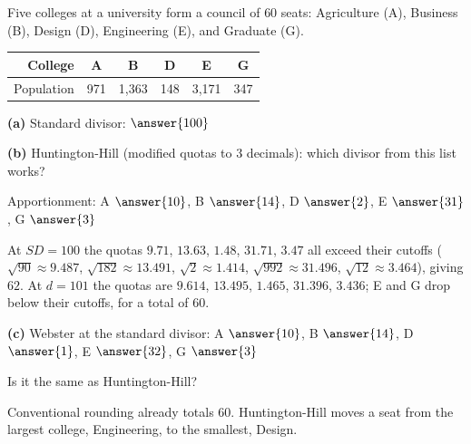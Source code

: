 \documentclass[12pt]{ximera}
\begin{document}
\begin{problem}
Five colleges at a university form a council of $60$ seats: Agriculture (A), Business
(B), Design (D), Engineering (E), and Graduate (G).
\begin{center}
\begin{tabular}{r|ccccc}
College & A & B & D & E & G\\\hline
Population & 971 & 1,363 & 148 & 3,171 & 347
\end{tabular}
\end{center}

\begin{prompt}
\textbf{(a)} Standard divisor: $\answer{100}$
\end{prompt}

\begin{prompt}
\textbf{(b)} Huntington-Hill (modified quotas to $3$ decimals): which divisor from this
list works?
\begin{multipleChoice}
\end{multipleChoice}

\smallskip
Apportionment: A $\answer{10}$, B $\answer{14}$, D $\answer{2}$, E $\answer{31}$,
G $\answer{3}$
\begin{feedback}
At $SD=100$ the quotas $9.71$, $13.63$, $1.48$, $31.71$, $3.47$ all exceed their cutoffs
($\sqrt{90}\approx9.487$, $\sqrt{182}\approx13.491$, $\sqrt2\approx1.414$,
$\sqrt{992}\approx31.496$, $\sqrt{12}\approx3.464$), giving $62$. At $d=101$ the quotas
are $9.614$, $13.495$, $1.465$, $31.396$, $3.436$; E and G drop below their cutoffs,
for a total of $60$.
\end{feedback}
\end{prompt}

\begin{prompt}
\textbf{(c)} Webster at the standard divisor: A $\answer{10}$, B $\answer{14}$,
D $\answer{1}$, E $\answer{32}$, G $\answer{3}$

\smallskip
Is it the same as Huntington-Hill?
\begin{multipleChoice}
\end{multipleChoice}
\begin{feedback}
Conventional rounding already totals $60$. Huntington-Hill moves a seat from the largest
college, Engineering, to the smallest, Design.
\end{feedback}
\end{prompt}
\end{problem}
\end{document}
